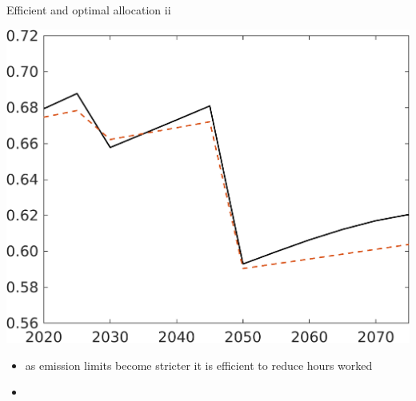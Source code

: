 \documentclass[11pt,aspectratio=169]{beamer}
\begin{document}
\begin{frame}{Efficient and optimal allocation ii }
\begin{minipage}[]{0.3\textwidth}
	\end{minipage}
	\begin{minipage}[]{0.3\textwidth}
		\includegraphics[width=1\textwidth]{../codding_model/own_basedOnFried/optimalPol_elastS_DisuSci/figures/all_1705/C_CompEffOPT_T_NoTaus_noopt_spillover0_noskill0_sep1_BN0_ineq0_red0_xgrowth0_zero0_countec0_etaa0.79_lgd0.png}
	\end{minipage}
	
	\vspace{3mm}
	\pause
	\begin{itemize}
		\item as emission limits become stricter it is efficient to reduce hours worked
		\item[] %
	\end{itemize}
\end{frame}
\end{document}

